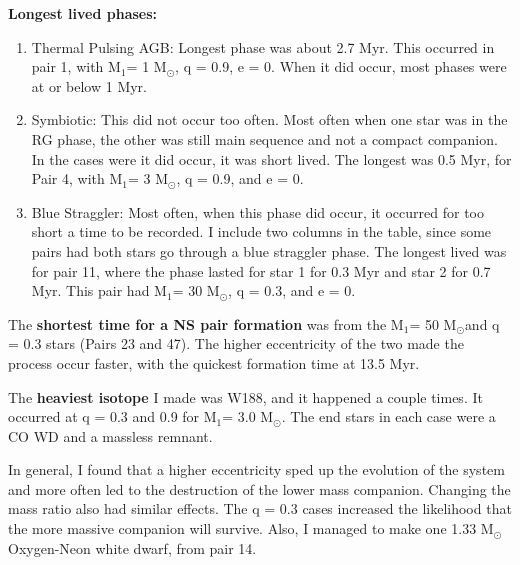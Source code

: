 \documentclass[12pt]{article}%
\newcommand{\msun}{M$_{\odot}$}
\newcommand{\mone}{M$_1$}
\begin{document}
\vspace{.1cm}

\textbf{Longest lived phases:}
\begin{enumerate}
\item Thermal Pulsing AGB: Longest phase was about 2.7 Myr. This occurred in pair 1, with \mone = 1 \msun, q = 0.9, e = 0. When it did occur, most phases were at or below 1 Myr.
\item Symbiotic: This did not occur too often. Most often when one star was in the RG phase, the other was still main sequence and not a compact companion. In the cases were it did occur, it was short lived. The longest was 0.5 Myr, for Pair 4, with \mone = 3 \msun, q = 0.9, and e = 0.
\item Blue Straggler: Most often, when this phase did occur, it occurred for too short a time to be recorded. I include two columns in the table, since some pairs had both stars go through a blue straggler phase. The longest lived was for pair 11, where the phase lasted for star 1 for 0.3 Myr and star 2 for 0.7 Myr. This pair had \mone = 30 \msun, q = 0.3, and e = 0.
\end{enumerate}

\vspace{.1cm}

The \textbf{shortest time for a NS pair formation} was from the \mone = 50 \msun and q = 0.3 stars (Pairs 23 and 47). The higher eccentricity of the two made the process occur faster, with the quickest formation time at 13.5 Myr. 

\vspace{.1cm}

The \textbf{heaviest isotope} I made was W188, and it happened a couple times. It occurred at q = 0.3 and 0.9 for \mone = 3.0 \msun. The end stars in each case were a CO WD and a massless remnant. 

\vspace{.1cm}

In general, I found that a higher eccentricity sped up the evolution of the system and more often led to the destruction of the lower mass companion. Changing the mass ratio also had similar effects. The q = 0.3 cases increased the likelihood that the more massive companion will survive. Also, I managed to make one 1.33 \msun~ Oxygen-Neon white dwarf, from pair 14. 
\end{document}
